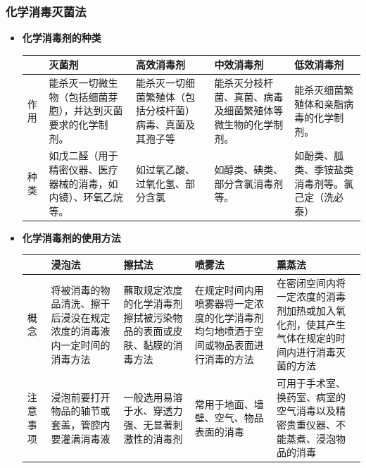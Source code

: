 \documentclass[11pt, a4paper]{ctexart}
\begin{document}
\subsubsection{化学消毒灭菌法}
\begin{itemize}
	\item \textbf{化学消毒剂的种类}
	      \begin{table}[htbp]
		      \centering
		      \begin{tabular}{|p{2cm}|p{3cm}|p{3cm}|p{3cm}|p{3cm}|}
			      \hline
			         & \textbf{灭菌剂}                    & \textbf{高效消毒剂}               & \textbf{中效消毒剂}                & \textbf{低效消毒剂}           \\
			      \hline
			      作用 & 能杀灭一切微生物（包括细菌芽胞），并达到灭菌要求的化学制剂。  & 能杀灭一切细菌繁殖体（包括分枝杆菌）病毒、真菌及其孢子等 & 能杀灭分枝杆菌、真菌、病毒及细菌繁殖体等微生物的化学制剂。 & 能杀灭细菌繁殖体和亲脂病毒的化学制剂。      \\
			      \hline
			      种类 & 如戊二醛（用于精密仪器、医疗器械的消毒，如内镜）、环氧乙烷等。 & 如过氧乙酸、过氧化氢、部分含氯              & 如醇类、碘类、部分含氯消毒剂等。              & 如酚类、胍类、季铵盐类消毒剂等。氯己定（洗必泰） \\
			      \hline
		      \end{tabular}
	      \end{table}
	\item \textbf{化学消毒剂的使用方法}
	      \begin{table}[htbp]
		      \centering
		      \begin{tabular}{|p{2cm}|p{3cm}|p{3cm}|p{3cm}|p{3cm}|}
			      \hline
			           & \textbf{浸泡法}                       & \textbf{擦拭法}                      & \textbf{喷雾法}                              & \textbf{熏蒸法}                                   \\
			      \hline
			      概念   & 将被消毒的物品清洗、擦干后浸没在规定浓度的消毒液内一定时间的消毒方法 & 蘸取规定浓度的化学消毒剂擦拭被污染物品的表面或皮肤、黏膜的消毒方法 & 在规定时间内用喷雾器将一定浓度的化学消毒剂均匀地喷洒于空间或物品表面进行消毒的方法 & 在密闭空间内将一定浓度的消毒剂加热或加入氧化剂，使其产生气体在规定的时间内进行消毒灭菌的方法 \\
			      \hline
			      注意事项 & 浸泡前要打开物品的轴节或套盖，管腔内要灌满消毒液           & 一般选用易溶于水、穿透力强、无显著刺激性的消毒剂          & 常用于地面、墙壁、空气、物品表面的消毒                       & 可用于手术室、换药室、病室的空气消毒以及精密贵重仪器、不能蒸煮、浸泡物品的消毒        \\
			      \hline
		      \end{tabular}
	      \end{table}
\end{itemize}
\end{document}
